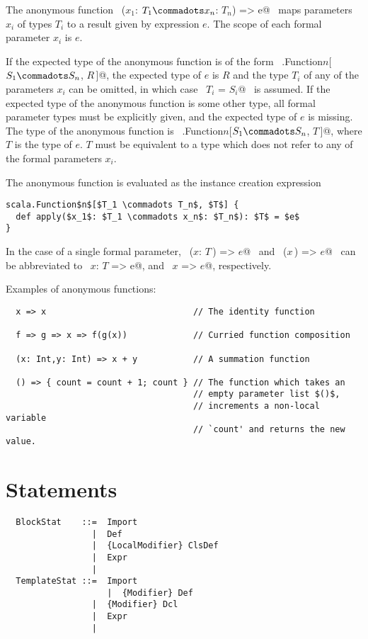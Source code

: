 \documentclass[a4paper,12pt,twoside,titlepage]{book}
\begin{document}
The anonymous function ~\lstinline@($x_1$: $T_1 \commadots x_n$: $T_n$) => e@~ 
maps parameters $x_i$ of types $T_i$ to a result given
by expression $e$. The scope of each formal parameter
$x_i$ is $e$.

If the expected type of the anonymous function is of the form
~\lstinline@scala.Function$n$[$S_1 \commadots S_n$, $R\,$]@, the expected type
of $e$ is $R$ and the type $T_i$ of any of the
parameters $x_i$ can be omitted, in which case
~\lstinline@$T_i$ = $S_i$@~ is assumed. If the expected type of the anonymous
function is some other type, all formal parameter types must be
explicitly given, and the expected type of $e$ is missing. The
type of the anonymous function is
~\lstinline@scala.Function$n$[$S_1 \commadots S_n$, $T\,$]@, where $T$ is
the type of $e$. $T$ must be equivalent to a type which does
not refer to any of the formal parameters $x_i$.

The anonymous function is evaluated as the instance creation expression
\begin{lstlisting}
scala.Function$n$[$T_1 \commadots T_n$, $T$] {
  def apply($x_1$: $T_1 \commadots x_n$: $T_n$): $T$ = $e$
}
\end{lstlisting}
In the case of a single formal parameter, ~\lstinline@($x$: $T\,$) => $e$@~ and ~\lstinline@($x\,$) => $e$@~ 
can be abbreviated to ~\lstinline@$x$: $T$ => e@, and ~\lstinline@$x$ => $e$@, respectively.

\example Examples of anonymous functions:

\begin{lstlisting}
  x => x                             // The identity function

  f => g => x => f(g(x))             // Curried function composition

  (x: Int,y: Int) => x + y           // A summation function

  () => { count = count + 1; count } // The function which takes an
                                     // empty parameter list $()$, 
                                     // increments a non-local variable 
                                     // `count' and returns the new value.
\end{lstlisting}

\section{Statements}
\label{sec:statements}

\syntax\begin{lstlisting}
  BlockStat    ::=  Import
                 |  Def
                 |  {LocalModifier} ClsDef
                 |  Expr
                 | 
  TemplateStat ::=  Import
                    |  {Modifier} Def
                 |  {Modifier} Dcl
                 |  Expr
                 | 
\end{lstlisting}
\end{document}
